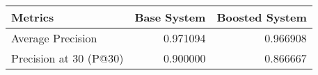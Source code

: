 \begin{tabular}{lrr}
\toprule
               Metrics &  Base System &  Boosted System \\
\midrule
     Average Precision &     0.971094 &        0.966908 \\
Precision at 30 (P@30) &     0.900000 &        0.866667 \\
\bottomrule
\end{tabular}
